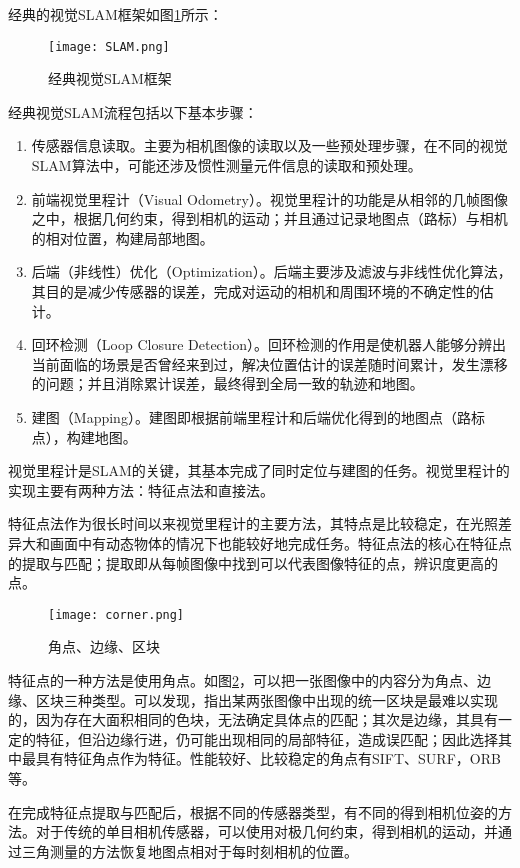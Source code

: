 经典的视觉SLAM框架如图\ref{fig5}所示：
~\\
\begin{figure}[!ht]
	\centering
	\texttt{[image: SLAM.png]}
	\caption{经典视觉SLAM框架} 
	\label{fig5}
\end{figure}

经典视觉SLAM流程包括以下基本步骤：
\begin{enumerate}
	\item 
	传感器信息读取。主要为相机图像的读取以及一些预处理步骤，在不同的视觉SLAM算法中，可能还涉及惯性测量元件信息的读取和预处理。
	\item 
	前端视觉里程计（Visual Odometry）。视觉里程计的功能是从相邻的几帧图像之中，根据几何约束，得到相机的运动；并且通过记录地图点（路标）与相机的相对位置，构建局部地图。
	\item 
	后端（非线性）优化（Optimization）。后端主要涉及滤波与非线性优化算法，其目的是减少传感器的误差，完成对运动的相机和周围环境的不确定性的估计。
	\item 
	回环检测（Loop Closure Detection）。回环检测的作用是使机器人能够分辨出当前面临的场景是否曾经来到过，解决位置估计的误差随时间累计，发生漂移的问题；并且消除累计误差，最终得到全局一致的轨迹和地图。
	\item 
	建图（Mapping）。建图即根据前端里程计和后端优化得到的地图点（路标点），构建地图。
\end{enumerate}

视觉里程计是SLAM的关键，其基本完成了同时定位与建图的任务。视觉里程计的实现主要有两种方法：特征点法和直接法。

特征点法作为很长时间以来视觉里程计的主要方法，其特点是比较稳定，在光照差异大和画面中有动态物体的情况下也能较好地完成任务。特征点法的核心在特征点的提取与匹配；提取即从每帧图像中找到可以代表图像特征的点，辨识度更高的点。

\begin{figure}[!ht]
	\centering
	\texttt{[image: corner.png]}
	\caption{角点、边缘、区块} 
	\label{fig6}
\end{figure}

特征点的一种方法是使用角点。如图\ref{fig6}，可以把一张图像中的内容分为角点、边缘、区块三种类型。可以发现，指出某两张图像中出现的统一区块是最难以实现的，因为存在大面积相同的色块，无法确定具体点的匹配；其次是边缘，其具有一定的特征，但沿边缘行进，仍可能出现相同的局部特征，造成误匹配；因此选择其中最具有特征角点作为特征。性能较好、比较稳定的角点有SIFT、SURF，ORB等。

在完成特征点提取与匹配后，根据不同的传感器类型，有不同的得到相机位姿的方法。对于传统的单目相机传感器，可以使用对极几何约束，得到相机的运动，并通过三角测量的方法恢复地图点相对于每时刻相机的位置。

